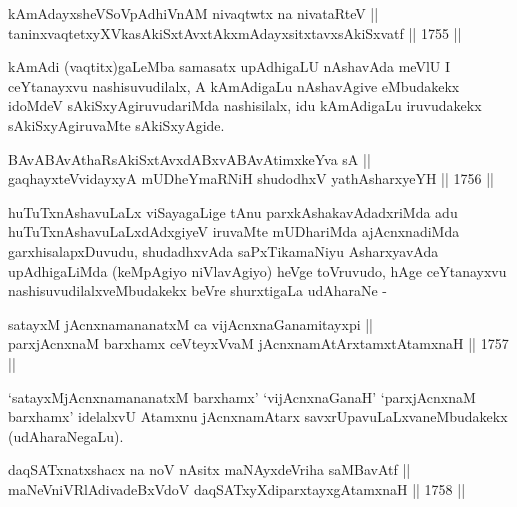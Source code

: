 
\begin{shl}
kAmAdayxsheVSoVpAdhiVnAM nivaqtwtx na nivataRteV || \\
taninxvaqtetxyXVkasAkiSxtAvxtAkxmAdayxsitxtavxsAkiSxvatf ||  1755 ||  
\end{shl}

\begin{artha}
kAmAdi (vaqtitx)gaLeMba samasatx upAdhigaLU nAshavAda meVlU I
ceYtanayxvu nashisuvudilalx, A kAmAdigaLu nAshavAgive eMbudakekx
idoMdeV sAkiSxyAgiruvudariMda nashisilalx, idu kAmAdigaLu iruvudakekx
sAkiSxyAgiruvaMte sAkiSxyAgide.
\end{artha}


\begin{shl}
BAvABAvAthaRsAkiSxtAvxdABxvABAvAtimxkeYva sA ||  \\
gaqhayxteV\s vidayxyA mUDheYmaRNiH shudodhxV yathA\s \s sharxyeYH ||  1756 ||  
\end{shl}

\begin{artha}
huTuTxnAshavuLaLx viSayagaLige tAnu parxkAshakavAdadxriMda adu
huTuTxnAshavuLaLxdAdxgiyeV iruvaMte mUDhariMda ajAcnxnadiMda
garxhisalapxDuvudu, shudadhxvAda saPxTikamaNiyu AsharxyavAda
upAdhigaLiMda (keMpAgiyo niVlavAgiyo) heVge toVruvudo, hAge
ceYtanayxvu nashisuvudilalxveMbudakekx beVre shurxtigaLa udAharaNe -
\end{artha}

\begin{shl}
satayxM jAcnxnamananatxM ca vijAcnxnaGanamitayxpi || \\
parxjAcnxnaM barxhamx ceVteyxVvaM jAcnxnamAtArxtamxtA\s \s tamxnaH ||  1757 ||  
\end{shl}

\begin{artha}
`satayxMjAcnxnamananatxM barxhamx' `vijAcnxnaGanaH' `parxjAcnxnaM barxhamx' idelalxvU Atamxnu jAcnxnamAtarx
savxrUpavuLaLxvaneMbudakekx (udAharaNegaLu).
\end{artha}


\begin{shl}
daqSATxnatxshacx na noV nAsitx maNAyxdeVriha saMBavAtf || \\
maNeVniVRlAdivadeBxVdoV daqSATxyXdiparxtayxgAtamxnaH ||  1758 ||  
\end{shl}

